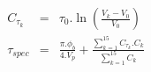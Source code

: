 \begin{eqnarray*}
C_{{\tau}_k} & = & \tau_0 . \ln \left( \frac{V_k - V_0}{V_0} \right) \\
\tau_{spec} & = & \frac{\pi. \phi_b}{4.V_p} + 
                  \frac{\displaystyle\sum_{k=1}^{15} C_{{\tau}_k}.C_k}
                   {\displaystyle\sum_{k=1}^{15} C_k} \\
\end{eqnarray*}
